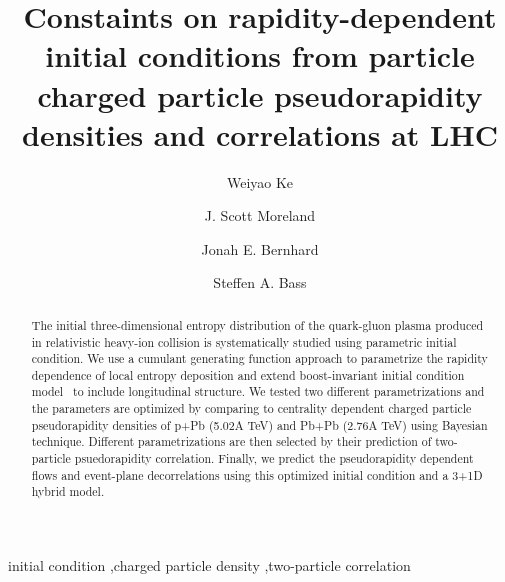 \documentclass[3p,times,twocolumn]{elsarticle}
\begin{document}
\begin{frontmatter}



\dochead{}

\title{Constaints on rapidity-dependent initial conditions from particle charged particle pseudorapidity densities and correlations at LHC}


\author{Weiyao Ke}
\author{J. Scott Moreland}
\author{Jonah E. Bernhard}
\author{Steffen A. Bass}

\address{Department of Physics, Duke University, Durham, NC 27708-0305, United States}

\begin{abstract}
The initial three-dimensional entropy distribution of the quark-gluon plasma produced in relativistic heavy-ion collision is systematically studied using parametric initial condition.
We use a cumulant generating function approach to parametrize the rapidity dependence of local entropy deposition and extend boost-invariant initial condition model \trento~to include longitudinal structure.
We tested two different parametrizations and the parameters are optimized by comparing to centrality dependent charged particle pseudorapidity densities of p+Pb (5.02A TeV) and Pb+Pb (2.76A TeV) using Bayesian technique.
Different parametrizations are then selected by their prediction of two-particle psuedorapidity correlation.
Finally, we predict the pseudorapidity dependent flows and event-plane decorrelations using this optimized initial condition and a 3+1D hybrid model.

\end{abstract}

\begin{keyword}
initial condition \sep charged particle density \sep two-particle correlation


\end{keyword}

\end{frontmatter}
\end{document}
